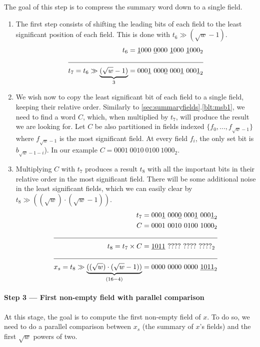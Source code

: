 The goal of this step is to compress the summary word down to a single field.

\begin{enumerate}
    \item \label{blt:summCompression1}
    The first step consists of shifting the leading bits of each field to the least significant position of each field. This is done with $t_6 \gg (\sqrt{w} - 1)$. 
    \begin{align*}
                    t_6 &= \underline{1}000\ \underline{0}000\ \underline{1}000\ \underline{1}000_2 \\ \cline{1-2} 
        t_7 = t_6 \gg \underbrace{(\sqrt{w} - 1)}_{3} &= 000\underline{1}\ 000\underline{0}\ 000\underline{1}\ 000\underline{1}_2
    \end{align*}
    
    \item \label{blt:summCompression2}
    We wish now to copy the least significant bit of each field to a single field, keeping their relative order.
    Similarly to \ref{sec:summaryfields}.\ref{blt:msb1}, we need to find a word $C$, which, when multiplied by $t_7$, will produce the result we are looking for.
    Let $C$ be also partitioned in fields indexed $\{f_0, ..., f_{\sqrt{w} - 1}\}$ where $f_{\sqrt{w} - 1}$ is the most significant field. At every field $f_i$, the only set bit is $b_{\sqrt{w} - 1 - i}$).
    In our example $C = 0001\ 0010\ 0100\ 1000_2$.
    
    \item \label{blt:summCompression3}
    Multiplying $C$ with $t_7$ produces a result $t_8$ with all the important bits in their relative order in the most significant field. There will be some additional noise in the least significant fields, which we can easily clear by $t_8 \gg ((\sqrt{w})\cdot(\sqrt{w} - 1))$.
        \begin{align*}
                         t_7 &= 000\underline{1}\ 000\underline{0}\ 000\underline{1}\ 000\underline{1}_2 \\
                           C &= 0001\ 0010\ 0100\ 1000_2 \\ \cline{1-2} 
          t_8 = t_7 \times C &= \underline{1011}\ ????\ ????\ ????_2\\ \cline{1-2}
        x_s = t_8 \gg \underbrace{((\sqrt{w})\cdot(\sqrt{w} - 1))}_{(16-4)} &= 0000\ 0000\ 0000\ \underline{1011}_2
    \end{align*}
\end{enumerate}

\paragraph{Step 3 --- First non-empty field with parallel comparison} \label{sec:parallel}
At this stage, the goal is to compute the first non-empty field of $x$. To do so, we need to do a parallel comparison between $x_s$ (the summary of $x$'s fields) and the first $\sqrt{w}$ powers of two.


